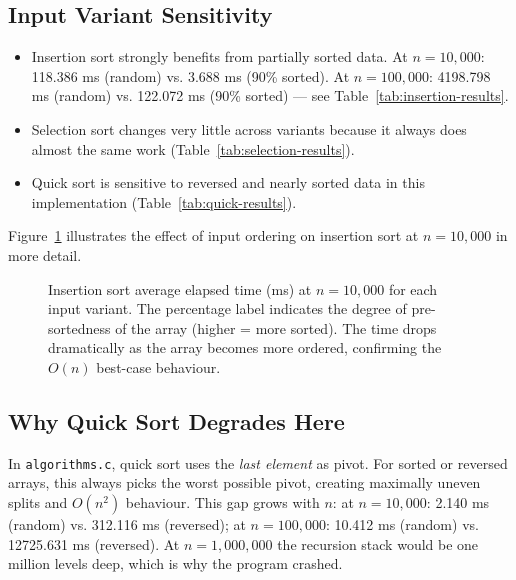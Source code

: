 \documentclass[11pt,a4paper]{article}
\begin{document}
\subsection{Input Variant Sensitivity}
\begin{itemize}
    \item Insertion sort strongly benefits from partially sorted data. At \(n=10{,}000\): 118.386 ms (random) vs. 3.688 ms (90\% sorted). At \(n=100{,}000\): 4198.798 ms (random) vs. 122.072 ms (90\% sorted) — see Table~\ref{tab:insertion-results}.
    \item Selection sort changes very little across variants because it always does almost the same work (Table~\ref{tab:selection-results}).
    \item Quick sort is sensitive to reversed and nearly sorted data in this implementation (Table~\ref{tab:quick-results}).
\end{itemize}

Figure~\ref{fig:insertion-variants} illustrates the effect of input ordering on insertion sort at $n=10{,}000$ in more detail.

\begin{figure}[H]
\centering
{}
\caption{Insertion sort average elapsed time (ms) at $n=10{,}000$ for each input variant. The percentage label indicates the degree of pre-sortedness of the array (higher = more sorted). The time drops dramatically as the array becomes more ordered, confirming the $O(n)$ best-case behaviour.}
\label{fig:insertion-variants}
\end{figure}

\subsection{Why Quick Sort Degrades Here}
In \texttt{algorithms.c}, quick sort uses the \emph{last element} as pivot. For sorted or reversed arrays, this always picks the worst possible pivot, creating maximally uneven splits and \(O(n^2)\) behaviour. This gap grows with \(n\): at \(n=10{,}000\): 2.140 ms (random) vs. 312.116 ms (reversed); at \(n=100{,}000\): 10.412 ms (random) vs. 12725.631 ms (reversed). At \(n=1{,}000{,}000\) the recursion stack would be one million levels deep, which is why the program crashed.
\end{document}
